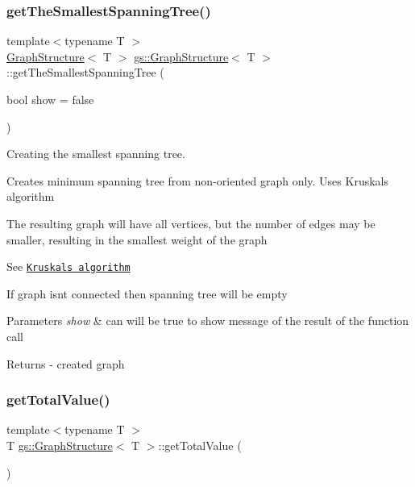 \subsubsection{\texorpdfstring{get\+The\+Smallest\+Spanning\+Tree()}{getTheSmallestSpanningTree()}}
{\footnotesize\ttfamily template$<$typename T $>$ \\
\mbox{\hyperlink{classgs_1_1_graph_structure}{Graph\+Structure}}$<$ T $>$ \mbox{\hyperlink{classgs_1_1_graph_structure}{gs\+::\+Graph\+Structure}}$<$ T $>$\+::get\+The\+Smallest\+Spanning\+Tree (\begin{DoxyParamCaption}\item[{bool}]{show = {\ttfamily false} }\end{DoxyParamCaption})}



Creating the smallest spanning tree. 

Creates minimum spanning tree from non-\/oriented graph only. Uses Kruskal\textquotesingle{}s algorithm

The resulting graph will have all vertices, but the number of edges may be smaller, resulting in the smallest weight of the graph

See \href{https://en.wikipedia.org/wiki/Kruskal%27s_algorithm}{\tt Kruskal\textquotesingle{}s algorithm}

If graph isn\textquotesingle{}t connected then spanning tree will be empty 
\begin{DoxyParams}{Parameters}
{\em show} & can will be true to show message of the result of the function call \\
\hline
\end{DoxyParams}
\begin{DoxyReturn}{Returns}
-\/ created graph 
\end{DoxyReturn}
\mbox{\label{classgs_1_1_graph_structure_a430f8d15cb01da7f7c7054b7a9e831ee}} 
\subsubsection{\texorpdfstring{get\+Total\+Value()}{getTotalValue()}}
{\footnotesize\ttfamily template$<$typename T $>$ \\
T \mbox{\hyperlink{classgs_1_1_graph_structure}{gs\+::\+Graph\+Structure}}$<$ T $>$\+::get\+Total\+Value (\begin{DoxyParamCaption}{ }\end{DoxyParamCaption})}

